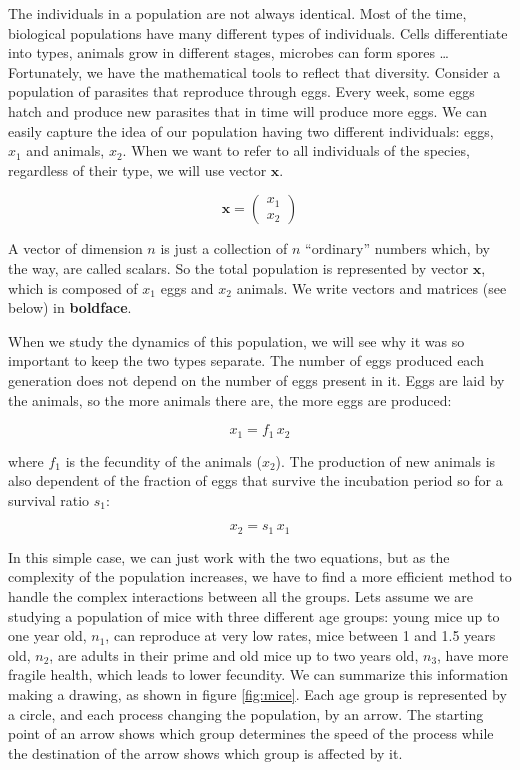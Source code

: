 \documentclass{tufte-book} %
\begin{document}
The  individuals in a population are not always identical. Most of the time, biological populations have many different types of individuals. Cells differentiate into types, animals grow in different stages, microbes can form spores \dots Fortunately, we have the mathematical tools to reflect that diversity. Consider a population of parasites that reproduce through eggs. Every week, some eggs hatch and produce new parasites that in time will produce more eggs. We can easily capture the idea of our population having two different individuals: eggs, $x_1$ and animals, $x_2$. When we want to refer to all individuals of the species, regardless of their type, we will use vector $\mathbf{x}$.

\begin{equation}
\mathbf{x} =\left( \begin{array}{c} x_1 \\  x_2 \end{array} \right)
\end{equation}

A vector of dimension $n$ is just a collection of $n$ ``ordinary'' numbers which, by the way, are called scalars. So the total population is represented by vector  $\mathbf{x}$, which is composed of $x_1$ eggs and $x_2$ animals. We write vectors and matrices (see below) in \textbf{boldface}.


When we study the dynamics of this population, we will see why it was so important to keep the two types separate. The number of eggs produced each generation does not depend on the number of eggs present in it. Eggs are laid by the animals, so the more animals there are, the more eggs are produced:

\begin{equation}
x_1 = f_{1} \,  x_2 
\end{equation}

where $f_1$ is the fecundity of the animals ($x_2$). The production of new animals is also dependent of the fraction of eggs that survive the incubation period so for a survival ratio $s_1$:

\begin{equation}
	x_2 = s_{1} \,  x_1 
\end{equation}

In this simple case, we can just work with the two equations, but as the complexity of the population increases, we have to find a more efficient method to handle the complex interactions between all the groups. Lets assume we are studying a population of mice with three different age groups: young  mice up to one year old, $n_1$, can reproduce at very low rates, mice between 1 and 1.5 years old, $n_2$, are adults in their prime and old mice up to two years old, $n_3$, have more fragile health, which leads to lower fecundity. We can summarize this information making a drawing, as shown in figure \ref{fig:mice}. Each age group is represented by a circle, and each process changing the population, by an arrow. The starting point of an arrow shows which group determines the speed of the process while the  destination of the arrow shows which group is affected by it.
\end{document}
